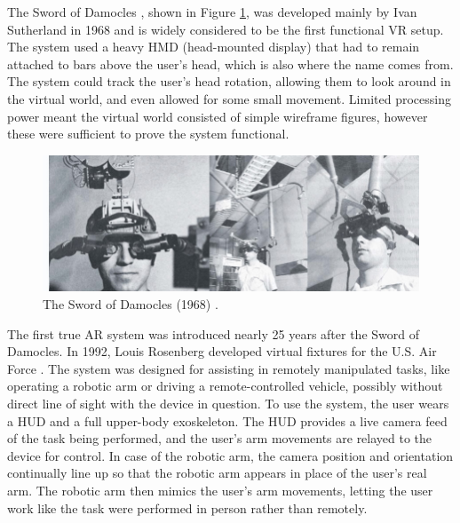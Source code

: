 The Sword of Damocles \cite{sutherland1968head}, shown in Figure \ref{fig:sword_of_damocles}, was developed mainly by Ivan Sutherland in 1968 and is widely considered to be the first functional VR setup. The system used a heavy HMD (head-mounted display) that had to remain attached to bars above the user's head, which is also where the name comes from. The system could track the user's head rotation, allowing them to look around in the virtual world, and even allowed for some small movement. Limited processing power meant the virtual world consisted of simple wireframe figures, however these were sufficient to prove the system functional.

\begin{figure}
    \centering
    \includegraphics[width=1.0\linewidth]{resources/introduction/sword_of_damocles.jpg}
    \caption{The Sword of Damocles (1968) \cite{sutherland1968head}.}
    \label{fig:sword_of_damocles}
\end{figure}

The first true AR system was introduced nearly 25 years after the Sword of Damocles. In 1992, Louis Rosenberg developed virtual fixtures for the U.S. Air Force \cite{rosenberg1992use}. The system was designed for assisting in remotely manipulated tasks, like operating a robotic arm or driving a remote-controlled vehicle, possibly without direct line of sight with the device in question. To use the system, the user wears a HUD and a full upper-body exoskeleton. The HUD provides a live camera feed of the task being performed, and the user's arm movements are relayed to the device for control. In case of the robotic arm, the camera position and orientation continually line up so that the robotic arm appears in place of the user's real arm. The robotic arm then mimics the user's arm movements, letting the user work like the task were performed in person rather than remotely.

